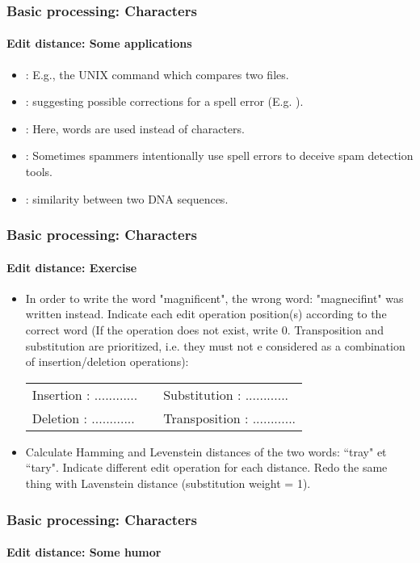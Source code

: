 \documentclass[xcolor=table]{beamer}
\begin{document}
\begin{frame}
\frametitle{Basic processing: Characters}
\framesubtitle{Edit distance: Some applications}

\begin{itemize}
	\item {}: E.g., the UNIX  command which compares two files.
	\item {}: suggesting possible corrections for a spell error (E.g. ).
	\item {}: Here, words are used instead of characters.
	\item {}: Sometimes spammers intentionally use spell errors to deceive spam detection tools.
	\item {}: similarity between two DNA sequences.
\end{itemize}

\end{frame}

\begin{frame}
	\frametitle{Basic processing: Characters}
	\framesubtitle{Edit distance: Exercise}
	
	\begin{itemize}
		\item In order to write the word "magnificent", the wrong word: "magnecifint" was written instead. Indicate each edit operation position(s) according to the correct word (If the operation does not exist, write 0. Transposition and substitution are prioritized, i.e. they must not e considered as a combination of insertion/deletion operations):
		\begin{tabular}{|lll|}
			\hline 
			Insertion : ............ & & Substitution  : ............ \\
			Deletion  : ............ & & Transposition : ............ \\
			\hline
		\end{tabular}
		
		\item Calculate Hamming and Levenstein distances of the two words: ``tray" et ``tary".
		Indicate different edit operation for each distance. Redo the same thing with Lavenstein distance (substitution weight = 1).
	\end{itemize}
	
\end{frame}

\begin{frame}
\frametitle{Basic processing: Characters}
\framesubtitle{Edit distance: Some humor}

\begin{center}
\end{center}

\end{frame}
\end{document}
